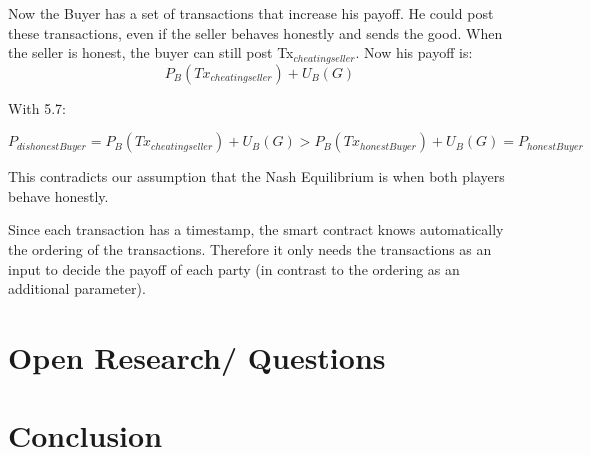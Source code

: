 \documentclass{cacthesis}
\begin{document}
Now the Buyer has a set of transactions that increase his payoff.  He could post these transactions, even if the seller behaves honestly and sends the good.\newline
{}
When the seller is honest, the buyer can still post Tx$_{cheatingseller}$. Now his payoff is:
\[P_{B}(Tx_{cheatingseller}) + U_B(G)\]

With 5.7:

\begin{equation}
    P_{dishonestBuyer} = P_{B}(Tx_{cheatingseller}) + U_B(G) > P_{B}(Tx_{honestBuyer}) + U_B(G) = P_{honestBuyer}
\end{equation}

This contradicts our assumption that the Nash Equilibrium is when both players behave honestly.

Since each transaction has a timestamp, the smart contract knows automatically the ordering of the transactions. Therefore it only needs the transactions as an input to decide the payoff of each party (in contrast to the ordering as an additional parameter).

\chapter{Open Research/ Questions}

\chapter{Conclusion}
	
	
	
	\appendix
\end{document}

